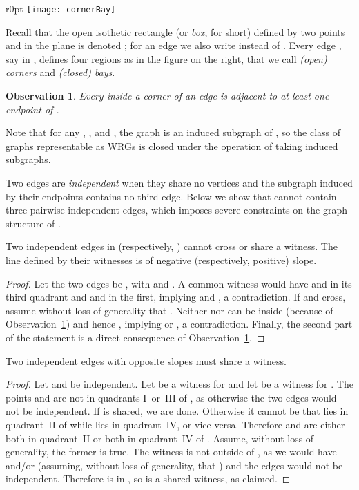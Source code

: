 \documentclass{llncs}
\newtheorem{observation}{Observation}
\begin{document}
\begin{wrapfigure}[7]{r}{0pt}
\texttt{[image: cornerBay]}
\end{wrapfigure}
Recall that the open isothetic rectangle (or \emph{box}, for short) defined
by two points  and  in the plane is denoted ; for an
edge  we also write  instead of .  Every edge ,
say in , defines four regions as in the figure on the right,
that we call \emph{(open) corners} and \emph{(closed) bays}.






\begin{observation} \label{obs:quadrants} Every  inside a
  corner of an edge  is adjacent to at least one endpoint of .
\end{observation}

Note that for any , , and , the graph 
is an induced subgraph of , so the class of graphs
representable as WRGs is closed under the operation of taking induced
subgraphs.

Two edges are \emph{independent} when they share no vertices and the
subgraph induced by their endpoints contains no third edge.  Below we
show that  cannot contain three pairwise independent edges, which
imposes severe constraints on the graph structure of .

\begin{lemma}
  \label{lem:2sameSlope}
  Two independent edges in  (respectively, ) cannot cross or
  share a witness.  The line defined by their witnesses is of negative
  (respectively, positive) slope.
\end {lemma}
\begin{proof} Let the two edges be , with 
  and .  A common witness would have  and  in its
  third quadrant and  and  in the first, implying  and
  , a contradiction.  If  and  cross, assume
  without loss of generality that .  Neither  nor 
  can be inside  (because of Observation~\ref{obs:quadrants})
  and hence , implying  or
  , a contradiction.  Finally, the second part of the
  statement is a direct consequence of
  Observation~\ref{obs:quadrants}. \hfill 
\end{proof}

\begin{lemma}
  \label{lem:2oppositeSlope}
  Two independent edges with opposite slopes must share a witness.
\end {lemma}
\begin{proof}
  Let  and  be independent.  Let  be a
  witness for  and let  be a witness for .  The points 
  and  are not in quadrants I~or~III of , as otherwise the two
  edges would not be independent.
If  is shared, we are done.  Otherwise it cannot be that  lies
  in quadrant~II of  while  lies in quadrant~IV, or vice versa.
  Therefore  and  are either both in quadrant~II or both in
  quadrant~IV of .  Assume, without loss of generality, the former
  is true.  The witness  is not outside of , as we would
  have  and/or  (assuming, without loss of
  generality, that ) and the edges would not be
  independent.  Therefore  is in , so  is a shared
  witness, as claimed. 
    \hspace*{0pt} \hfill 
\end{proof}
\end{document}
